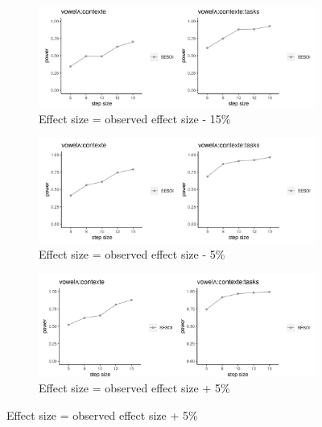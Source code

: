 \documentclass[12 pt]{article}
\begin{document}
\newpage
\begin{figure} \label{figure_power_analysis_f1}
	\centering
	\begin{subfigure}[t]{0.8\textwidth}
		\centering
		\includegraphics[width=\textwidth]{powerplot_f1_minus15} 
		\caption{Effect size = observed effect size - 15\%} \label{f1_minus15}
	\end{subfigure}
	
	\begin{subfigure}[t]{0.8\textwidth}
		\centering
		\includegraphics[width=\textwidth]{powerplot_f1_minus5} 
		\caption{Effect size = observed effect size - 5\%} \label{f1_minus5}
	\end{subfigure}
	
	
	\begin{subfigure}[t]{0.8\textwidth}
		\centering
		\includegraphics[width=\textwidth]{powerplot_f1_plus5} 
		\caption{Effect size = observed effect size + 5\%} \label{f1_plus5}
	\end{subfigure}
	

\end{figure}
\end{document}

